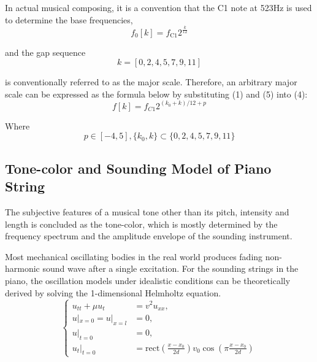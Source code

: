 \documentclass[conference]{IEEEtran}
\begin{document}
In actual musical composing, it is a convention that the C1 note at 523Hz is used to determine the base frequencies,
\begin{equation}
	f_{0}[k]=f_{\text{C1}}2^{\frac{k}{12}}
\end{equation}

and the gap sequence
\begin{equation}
	k=[0,2,4,5,7,9,11]
\end{equation}

is conventionally referred to as the major scale. Therefore, an arbitrary major scale can be expressed as the formula below by substituting (1) and (5) into (4):
\begin{equation}
	f[k]=f_{C1}2^{(k_{0}+k)/12+p}
\end{equation}

Where
\begin{equation}
	p\in[-4,5],\{k_{0},k\}\subset\{0,2,4,5,7,9,11\}
\end{equation}

\subsection{Tone-color and Sounding Model of Piano String}
The subjective features of a musical tone other than its pitch, intensity and length is concluded as the tone-color, which is mostly determined by the frequency spectrum and the amplitude envelope of the sounding instrument.

Most mechanical oscillating bodies in the real world produces fading non-harmonic sound wave after a single excitation. For the sounding strings in the piano, the oscillation models under idealistic conditions can be theoretically derived by solving the 1-dimensional Helmholtz equation.
\begin{equation}
	\begin{cases}
		u_{tt}+\mu u_{t}  & =v^{2}u_{xx},                                                                               \\
		u|_{x=0}=u|_{x=l} & =0,                                                                                         \\
		u|_{t=0}          & =0,                                                                                         \\
		u_{t}|_{t=0}      & =\text{rect}\left( \frac{x-x_{0}}{2d} \right)v_{0}\cos\left( \pi \frac{x-x_{0}}{2d} \right)
	\end{cases}
\end{equation}
\end{document}
